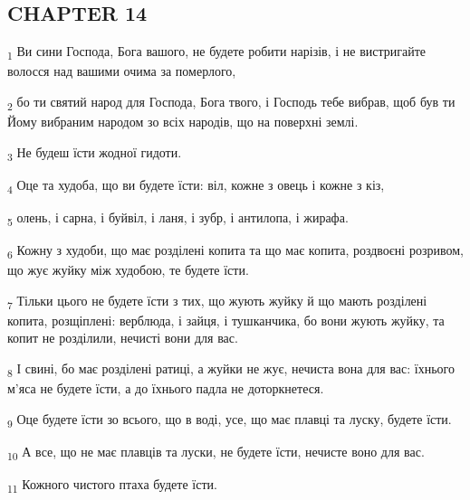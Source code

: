 \subsection{CHAPTER 14}
\begin{tcolorbox}
\textsubscript{1} Ви сини Господа, Бога вашого, не будете робити нарізів, і не вистригайте волосся над вашими очима за померлого,
\end{tcolorbox}
\begin{tcolorbox}
\textsubscript{2} бо ти святий народ для Господа, Бога твого, і Господь тебе вибрав, щоб був ти Йому вибраним народом зо всіх народів, що на поверхні землі.
\end{tcolorbox}
\begin{tcolorbox}
\textsubscript{3} Не будеш їсти жодної гидоти.
\end{tcolorbox}
\begin{tcolorbox}
\textsubscript{4} Оце та худоба, що ви будете їсти: віл, кожне з овець і кожне з кіз,
\end{tcolorbox}
\begin{tcolorbox}
\textsubscript{5} олень, і сарна, і буйвіл, і ланя, і зубр, і антилопа, і жирафа.
\end{tcolorbox}
\begin{tcolorbox}
\textsubscript{6} Кожну з худоби, що має розділені копита та що має копита, роздвоєні розривом, що жує жуйку між худобою, те будете їсти.
\end{tcolorbox}
\begin{tcolorbox}
\textsubscript{7} Тільки цього не будете їсти з тих, що жують жуйку й що мають розділені копита, розщіплені: верблюда, і зайця, і тушканчика, бо вони жують жуйку, та копит не розділили, нечисті вони для вас.
\end{tcolorbox}
\begin{tcolorbox}
\textsubscript{8} І свині, бо має розділені ратиці, а жуйки не жує, нечиста вона для вас: їхнього м'яса не будете їсти, а до їхнього падла не доторкнетеся.
\end{tcolorbox}
\begin{tcolorbox}
\textsubscript{9} Оце будете їсти зо всього, що в воді, усе, що має плавці та луску, будете їсти.
\end{tcolorbox}
\begin{tcolorbox}
\textsubscript{10} А все, що не має плавців та луски, не будете їсти, нечисте воно для вас.
\end{tcolorbox}
\begin{tcolorbox}
\textsubscript{11} Кожного чистого птаха будете їсти.
\end{tcolorbox}
